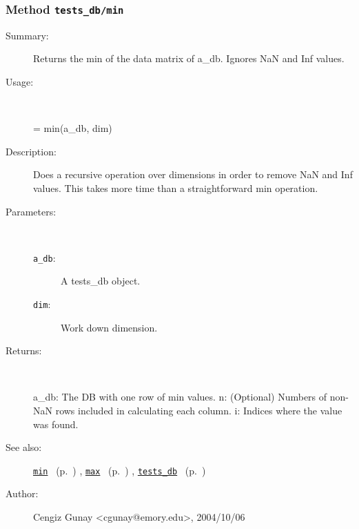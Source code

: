 \subsubsection[Method \texttt{min}]{Method \texttt{tests\_db/min}}%
%
\label{ref_tests_db__min}%
\hypertarget{ref_tests_db__min}{}%
\begin{description}
\item[Summary:]Returns the min of the data matrix of a\_db. Ignores NaN and Inf values.
%
\item[Usage:]~%
\begin{lyxcode}%
[a\_db, n, i] = min(a\_db, dim)
%
\end{lyxcode}%
%
\item[Description:]%
Does a recursive operation over dimensions in order to remove NaN and
 Inf values. This takes more time than a straightforward min operation. 
\item[Parameters:]~
\begin{description}%
\item[\texttt{a\_db}:]
 A tests\_db object.
\item[\texttt{dim}:]
 Work down dimension.
\end{description}%
%
\item[Returns:
]~

   a\_db: The DB with one row of min values.
   n: (Optional) Numbers of non-NaN rows included in calculating
	each column.
   i: Indices where the value was found.
%
%
\item[See also:]%
\hyperlink{ref_min}{\texttt{min}}%
\ (p.~\pageref{ref_min})%
%
, \hyperlink{ref_max}{\texttt{max}}%
\ (p.~\pageref{ref_max})%
%
, \hyperlink{ref_tests_db}{\texttt{tests\_db}}%
\ (p.~\pageref{ref_tests_db})%
%
%
\item[Author:]%
Cengiz Gunay <cgunay@emory.edu>, 2004/10/06
%
\end{description}
\methodline%
